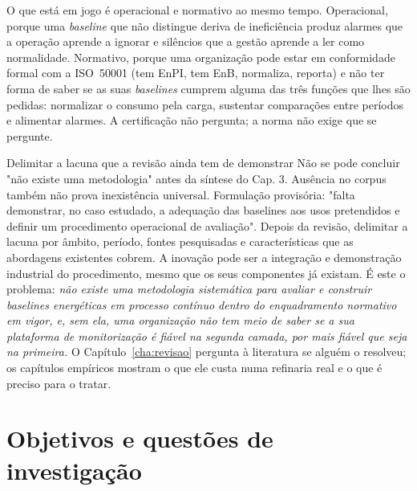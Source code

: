 
O que está em jogo é operacional e normativo ao mesmo tempo.
Operacional, porque uma \emph{baseline} que não distingue deriva de
ineficiência produz alarmes que a operação aprende a ignorar e
silêncios que a gestão aprende a ler como normalidade. Normativo, porque
uma organização pode estar em conformidade formal com a ISO~50001 (tem
EnPI, tem EnB, normaliza, reporta) e não ter forma de saber se as
suas \emph{baselines} cumprem alguma das três funções que lhes são
pedidas: normalizar o consumo pela carga, sustentar comparações entre
períodos e alimentar alarmes. A certificação não pergunta; a norma não
exige que se pergunte.

{Delimitar a lacuna que a revisão ainda tem de demonstrar}
{Não se pode concluir "não existe uma metodologia" antes da síntese do
Cap. 3. Ausência no corpus também não prova inexistência universal.
Formulação provisória: "falta demonstrar, no caso estudado, a adequação
das baselines aos usos pretendidos e definir um procedimento operacional
de avaliação". Depois da revisão, delimitar a lacuna por âmbito, período,
fontes pesquisadas e características que as abordagens existentes cobrem.
A inovação pode ser a integração e demonstração industrial do procedimento,
mesmo que os seus componentes já existam.}%
É este o problema: \emph{não existe uma metodologia sistemática para
avaliar e construir \emph{baselines} energéticas em processo contínuo
dentro do enquadramento normativo em vigor, e, sem ela, uma organização
não tem meio de saber se a sua plataforma de monitorização é fiável na
segunda camada, por mais fiável que seja na primeira.} O
Capítulo~\ref{cha:revisao} pergunta à literatura se alguém o resolveu;
os capítulos empíricos mostram o que ele custa numa refinaria real e o
que é preciso para o tratar.

\section{Objetivos e questões de investigação}
\label{sec:objetivos}

